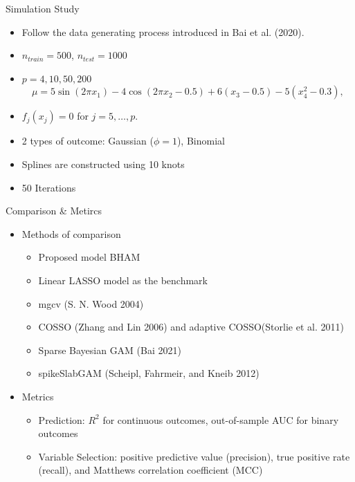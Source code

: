 \documentclass[
  ignorenonframetext,
  aspectratio=169]{beamer}
\providecommand{\tightlist}{%
  \setlength{\itemsep}{0pt}\setlength{\parskip}{0pt}}
\begin{document}
\begin{frame}{Simulation Study}
\protect\hypertarget{simulation-study}{}
\begin{itemize}
\item
  Follow the data generating process introduced in Bai et al. (2020).
\item
  \(n_{train} = 500\), \(n_{test}=1000\)
\item
  \(p=4, 10, 50, 200\) \[
  \mu = 5 \sin(2\pi x_1) - 4 \cos(2\pi x_2 -0.5) + 6(x_3-0.5) - 5(x_4^2 -0.3),
  \]
\item
  \(f_j(x_j) = 0\) for \(j = 5, \dots, p\).
\item
  2 types of outcome: Gaussian (\(\phi=1\)), Binomial
\item
  Splines are constructed using 10 knots
\item
  50 Iterations
\end{itemize}
\end{frame}

\begin{frame}{Comparison \& Metircs}
\protect\hypertarget{comparison-metircs}{}
\begin{itemize}
\tightlist
\item
  Methods of comparison

  \begin{itemize}
  \tightlist
  \item
    Proposed model BHAM
  \item
    Linear LASSO model as the benchmark
  \item
    mgcv (S. N. Wood 2004)
  \item
    COSSO (Zhang and Lin 2006) and adaptive COSSO(Storlie et al. 2011)
  \item
    Sparse Bayesian GAM (Bai 2021)
  \item
    spikeSlabGAM (Scheipl, Fahrmeir, and Kneib 2012)
  \end{itemize}
\item
  Metrics

  \begin{itemize}
  \tightlist
  \item
    Prediction: \(R^2\) for continuous outcomes, out-of-sample AUC for
    binary outcomes
  \item
    Variable Selection: positive predictive value (precision), true
    positive rate (recall), and Matthews correlation coefficient (MCC)
  \end{itemize}
\end{itemize}
\end{frame}
\end{document}
